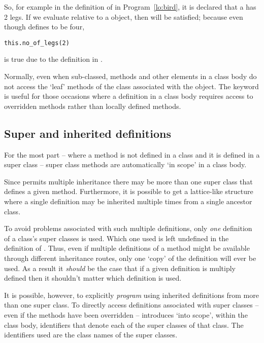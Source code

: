 So, for example in the definition of  in Program~\vref{lo:bird}, it is declared that a  has 2 legs. If we evaluate  relative to a  object, then  will be satisfied; because even though  defines  to be four,
\begin{alltt}
this.no\_of\_legs(2)
\end{alltt}
is true due to the definition in .

Normally, even when sub-classed, methods and other elements in a class body do not access the `leaf' methods of the class associated with the object. The  keyword is useful for those occasions where a definition in a class body requires access to overridden methods rather than locally defined methods.

\subsection{Super and inherited definitions}
\label{objects:super}
For the most part -- where a method is not defined in a class and it is defined in a super class -- super class methods are automatically `in scope' in a class body. 

Since \go permits multiple inheritance there may be more than one super class that defines a given method. Furthermore, it is possible to get a lattice-like structure where a single definition may be inherited multiple times from a single ancestor class.

To avoid problems associated with such multiple definitions, only \emph{one} definition of a class's super classes is used. Which one used is left undefined in the definition of \go. Thus, even if multiple definitions of a method might be available through different inheritance routes, only one `copy' of the definition will ever be used.  As a result it \emph{should} be the case that if a given definition is multiply defined then it shouldn't matter which definition is used.

It is possible, however, to explicitly \emph{program} using inherited definitions from more than one super class. To directly access definitions associated with super classes -- even if the methods have been overridden -- \go introduces `into scope', within the class body, identifiers that denote each of the super classes of that class. The identifiers used are the class names of the super classes.

